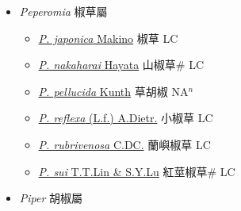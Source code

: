 
  \begin{itemize}
 \item[] \textit{Peperomia} 椒草屬
                    
  \begin{itemize}
        \item[] \href{http://www.theplantlist.org/tpl1.1/search?q=Peperomia+japonica}{\textit{P. japonica} Makino}   椒草 LC
        \item[] \href{http://www.theplantlist.org/tpl1.1/search?q=Peperomia+nakaharai}{\textit{P. nakaharai} Hayata}   山椒草\# LC
        \item[] \href{http://www.theplantlist.org/tpl1.1/search?q=Peperomia+pellucida}{\textit{P. pellucida} Kunth}   草胡椒 NA$^n$
        \item[] \href{http://www.theplantlist.org/tpl1.1/search?q=Peperomia+reflexa}{\textit{P. reflexa} (L.f.) A.Dietr.}   小椒草 LC
        \item[] \href{http://www.theplantlist.org/tpl1.1/search?q=Peperomia+rubrivenosa}{\textit{P. rubrivenosa} C.DC.}   蘭嶼椒草 LC
        \item[] \href{http://www.theplantlist.org/tpl1.1/search?q=Peperomia+sui}{\textit{P. sui} T.T.Lin \& S.Y.Lu}   紅莖椒草\# LC
  \end{itemize}
 \item[] \textit{Piper} 胡椒屬
                    

\end{itemize}
